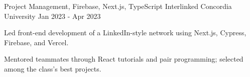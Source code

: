\begin{cventries}
  \cventry
    {Project Management, Firebase, Next.js, TypeScript} %
    {Interlinked} %
    {Concordia University} %
    {Jan 2023 - Apr 2023} %
    {
      \begin{cvitems} %
        \item {Led front-end development of a LinkedIn-style network using Next.js, Cypress, Firebase, and Vercel.}
        \item {Mentored teammates through React tutorials and pair programming; selected among the class's best projects.}
      \end{cvitems}
    }

\end{cventries}
